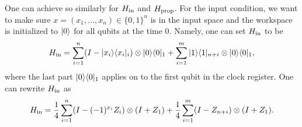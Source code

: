One can achieve so similarly for $H_{\mathrm{in}}$ and $H_{\mathrm{prop}}$. For the input condition, we want to make sure $x=(x_1, \ldots, x_n) \in \{0,1\}^n$ is in the input space and the workspace is initialized to $\ket{0}$ for all qubits at the time $0$. Namely, one can set $H_{\mathrm{in}}$ to be
\begin{equation} 
    H_{\mathrm{in}} = \sum_{i=1}^n(I- |x_i\rangle\langle x_i|_i)\otimes |0\rangle\langle 0|_1 + \sum_{i=1}^m |1\rangle\langle 1|_{n+i} \otimes |0\rangle\langle 0|_1, 
\end{equation}
where the last part $|0\rangle\langle 0|_1$ applies on to the first qubit in the clock register. One can rewrite $H_{\mathrm{in}}$ as 
\begin{equation}\label{eqn:Hin}
 H_{\mathrm{in}}=\frac{1}{4}\sum_{i=1}^n(I-(-1)^{x_i}Z_i)\otimes(I+Z_1) + \frac{1}{4} \sum_{i=1}^m (I - Z_{n+i}) \otimes (I + Z_1). 
\end{equation}

